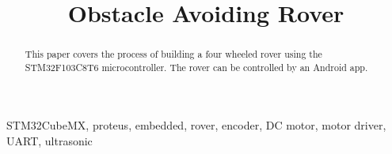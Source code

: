 \title{Obstacle Avoiding Rover}

\author{
}

\maketitle

\begin{abstract}
This paper covers the process of building a four wheeled rover using the STM32F103C8T6 microcontroller. The rover can be controlled by an Android app.
\end{abstract}

\begin{IEEEkeywords}
STM32CubeMX, proteus, embedded, rover, encoder, DC motor, motor driver, UART, ultrasonic
\end{IEEEkeywords}